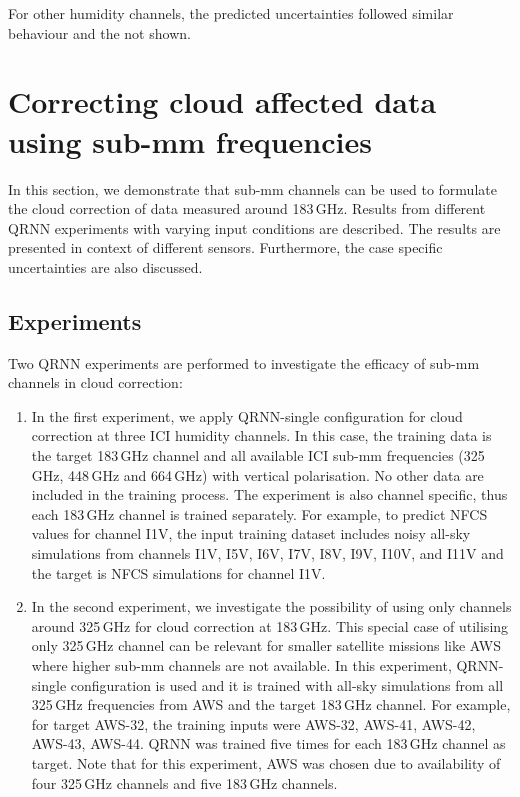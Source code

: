 \documentclass[amt, manuscript]{copernicus}
\begin{document}
For other humidity channels, the predicted uncertainties followed similar behaviour and the not shown. 


\section{Correcting cloud affected data using sub-mm frequencies}
\label{qrnn_ici}
In this section, we demonstrate that sub-mm channels can be used to formulate the cloud correction of data measured around 183\,GHz. Results from different QRNN experiments with varying input conditions are described. The results are presented in context of different sensors. Furthermore, the case specific uncertainties are also discussed.

\subsection{Experiments}
%
Two QRNN experiments are performed to investigate the efficacy of sub-mm channels in cloud correction: 
\begin{enumerate}
	\item In the first experiment, we apply QRNN-single configuration for cloud correction at three ICI humidity channels. In this case, the training data is the target 183\,GHz channel and all available ICI sub-mm frequencies (325\,GHz, 448\,GHz and 664\,GHz) with vertical polarisation. No other data are included in the training process. The experiment is also channel specific, thus each 183\,GHz channel is trained separately. For example, to predict NFCS values for channel I1V, the input training dataset includes noisy all-sky simulations from channels I1V, I5V, I6V, I7V, I8V, I9V, I10V, and I11V and the target is NFCS simulations for channel I1V.
	
	\item In the second experiment, we investigate the possibility of using only channels around 325\,GHz for cloud correction at 183\,GHz. This special case of utilising only 325\,GHz channel can be relevant for smaller satellite missions like AWS where higher sub-mm channels are not available. In this experiment, QRNN-single configuration is used and it is trained with all-sky simulations from all 325\,GHz frequencies from AWS and the target 183\,GHz channel. For example, for target AWS-32, the training inputs were AWS-32, AWS-41, AWS-42, AWS-43, AWS-44. QRNN was trained five times for each 183\,GHz channel as target. Note that for this experiment, AWS was chosen due to availability of four 325\,GHz channels and five 183\,GHz channels. 	
\end{enumerate}	
\end{document}
